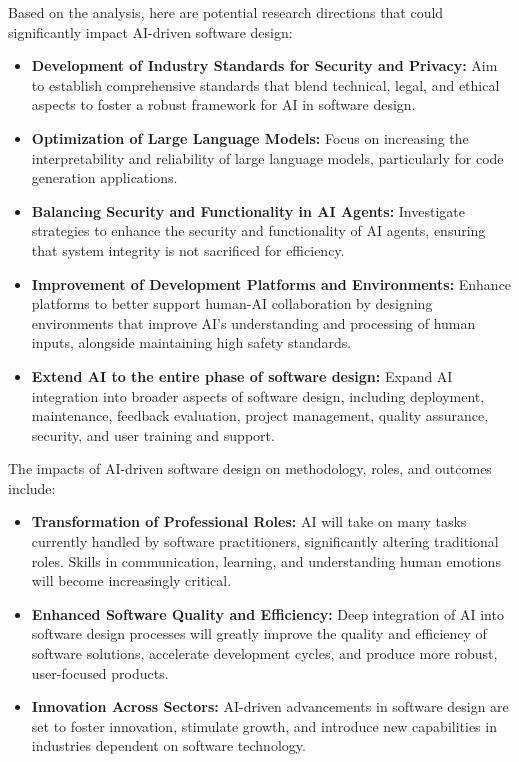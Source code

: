\documentclass{article}
\begin{document}
Based on the analysis, here are potential research directions that could significantly impact AI-driven software design:

\begin{itemize}
    \item \textbf{Development of Industry Standards for Security and Privacy:} Aim to establish comprehensive standards that 
    blend technical, legal, and ethical aspects to foster a robust framework for AI in software design.
    \item \textbf{Optimization of Large Language Models:} 
    Focus on increasing the interpretability and reliability of large language models, particularly for code generation applications.
    \item \textbf{Balancing Security and Functionality in AI Agents:} 
    Investigate strategies to enhance the security and functionality of AI agents, ensuring that system integrity is not sacrificed 
    for efficiency.
    \item \textbf{Improvement of Development Platforms and Environments:} 
    Enhance platforms to better support human-AI collaboration by designing environments that improve AI's understanding and 
    processing of human inputs, alongside maintaining high safety standards.
    \item \textbf{Extend AI to the entire phase of software design:} 
    Expand AI integration into broader aspects of software design, including deployment, maintenance, feedback evaluation, 
    project management, quality assurance, security, and user training and support.
\end{itemize}

The impacts of AI-driven software design on methodology, roles, and outcomes include:

\begin{itemize}
    \item \textbf{Transformation of Professional Roles:} 
    AI will take on many tasks currently handled by software practitioners, significantly altering traditional roles. Skills in communication, 
    learning, and understanding human emotions will become increasingly critical.
    \item \textbf{Enhanced Software Quality and Efficiency:} 
    Deep integration of AI into software design processes will greatly improve the quality and efficiency of software solutions, accelerate 
    development cycles, and produce more robust, user-focused products.
    \item \textbf{Innovation Across Sectors:} 
    AI-driven advancements in software design are set to foster innovation, stimulate growth, and introduce new capabilities in industries 
    dependent on software technology.
\end{itemize}
\end{document}
